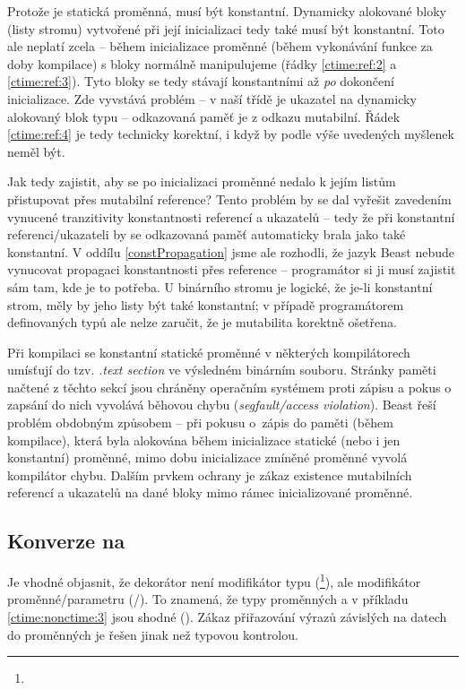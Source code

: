 Protože  je statická \ctime proměnná, musí být konstantní. Dynamicky alokované bloky (listy stromu) vytvořené při její inicializaci tedy také musí být konstantní. Toto ale neplatí zcela -- během inicializace proměnné  (během vykonávání funkce  za doby kompilace) s bloky normálně manipulujeme (řádky \ref{ctime:ref:2} a \ref{ctime:ref:3}). Tyto bloky se tedy stávají konstantními až \textit{po} dokončení inicializace. Zde vyvstává problém -- v naší třídě  je ukazatel na dynamicky alokovaný blok typu  -- odkazovaná paměť je z odkazu mutabilní. Řádek \ref{ctime:ref:4} je tedy technicky korektní, i když by podle výše uvedených myšlenek neměl být.

Jak tedy zajistit, aby se po inicializaci proměnné  nedalo k jejím listům přistupovat přes mutabilní reference? Tento problém by se dal vyřešit zavedením vynucené tranzitivity konstantnosti referencí a ukazatelů -- tedy že při konstantní referenci/ukazateli by se odkazovaná paměť automaticky brala jako také konstantní. V oddílu \ref{constPropagation} jsme ale rozhodli, že jazyk Beast nebude vynucovat propagaci konstantnosti přes reference -- programátor si ji musí zajistit sám tam, kde je to potřeba. U binárního stromu je logické, že je-li konstantní strom, měly by jeho listy být také konstantní; v případě programátorem definovaných typů ale nelze zaručit, že je mutabilita korektně ošetřena.

Při kompilaci se konstantní statické proměnné v některých kompilátorech umísťují do tzv. \textit{.text section} ve výsledném binárním souboru. Stránky paměti načtené z těchto sekcí jsou chráněny operačním systémem proti zápisu a pokus o zapsání do nich vyvolává běhovou chybu (\textit{segfault/access violation}). Beast řeší problém obdobným způsobem -- při pokusu o~zápis do paměti (během kompilace), která byla alokována během inicializace statické \ctime (nebo i jen konstantní) proměnné, mimo dobu inicializace zmíněné proměnné vyvolá kompilátor chybu. Dalším prvkem ochrany je zákaz existence mutabilních referencí a ukazatelů na dané bloky mimo rámec inicializované proměnné.

\subsection{Konverze na \nonctime}
Je vhodné objasnit, že dekorátor  není modifikátor typu (\footnote{}), ale modifikátor proměnné/parametru (/). To znamená, že typy proměnných  a  v příkladu \ref{ctime:nonctime:3} jsou shodné (). Zákaz přiřazování výrazů závislých na \nonctime datech do \ctime proměnných je řešen jinak než typovou kontrolou.

